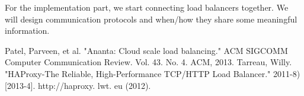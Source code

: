 \documentclass[11pt,letter]{article}
\begin{document}
For the implementation part, we start connecting load balancers together. We will design communication protocols and when/how they share some meaningful information. 

\begin{thebibliography}{9}
  Patel, Parveen, et al. "Ananta: Cloud scale load balancing." ACM SIGCOMM Computer Communication Review. Vol. 43. No. 4. ACM, 2013.
  Tarreau, Willy. "HAProxy-The Reliable, High-Performance TCP/HTTP Load Balancer." 2011-8)[2013-4]. http://haproxy. lwt. eu (2012).
\end{thebibliography}
\end{document}
